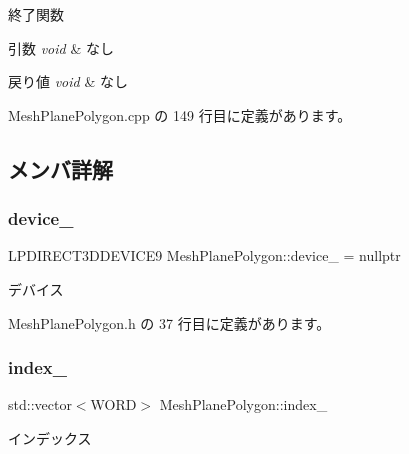 終了関数 


\begin{DoxyParams}{引数}
{\em void} & なし \\
\hline
\end{DoxyParams}

\begin{DoxyRetVals}{戻り値}
{\em void} & なし \\
\hline
\end{DoxyRetVals}


 Mesh\+Plane\+Polygon.\+cpp の 149 行目に定義があります。



\subsection{メンバ詳解}
\mbox{\label{class_mesh_plane_polygon_a58be2f5d0a6f3baf38a515dc8ef201ac}} 
\subsubsection{\texorpdfstring{device\+\_\+}{device\_}}
{\footnotesize\ttfamily L\+P\+D\+I\+R\+E\+C\+T3\+D\+D\+E\+V\+I\+C\+E9 Mesh\+Plane\+Polygon\+::device\+\_\+ = nullptr\hspace{0.3cm}{\ttfamily [private]}}



デバイス 



 Mesh\+Plane\+Polygon.\+h の 37 行目に定義があります。

\mbox{\label{class_mesh_plane_polygon_ad97af9abf051fc90ab9b9086dbc9a2f9}} 
\subsubsection{\texorpdfstring{index\+\_\+}{index\_}}
{\footnotesize\ttfamily std\+::vector$<$W\+O\+RD$>$ Mesh\+Plane\+Polygon\+::index\+\_\+\hspace{0.3cm}{\ttfamily [private]}}



インデックス 



